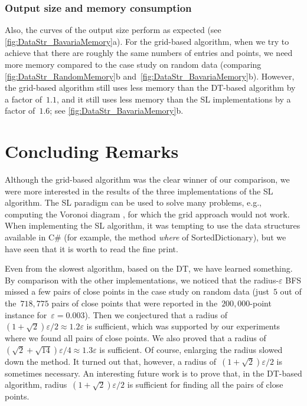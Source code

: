 \subsubsection{Output size and memory consumption}
Also, the curves of the output size perform as expected
(see \fig\ref{fig:DataStr_BavariaMemory}a). 
For the grid-based algorithm, when we try to achieve that 
there are roughly the same numbers of entries and points, 
we need more memory compared to the case study on random data
(comparing \figs\ref{fig:DataStr_RandomMemory}b
and~\ref{fig:DataStr_BavariaMemory}b). 
However, the grid-based algorithm still uses less memory 
than the DT-based algorithm by a factor of~$1.1$, 
and it still uses less memory than the SL 
implementations by a factor of~$1.6$;
see \fig\ref{fig:DataStr_BavariaMemory}b.





\section{Concluding Remarks}\label{sec:DataStr_Conclusion}
Although the grid-based algorithm was the clear winner of our 
comparison, we were more interested in the results of the three 
implementations of the SL algorithm. 
The SL paradigm can be used to solve many problems,
e.g., computing the Voronoi diagram 
\parencite{Fortune1987Voronoi}, 
for which the grid approach would not work. 
When implementing the SL algorithm, 
it was tempting to use the data structures 
available in C\# (for example, the 
method \emph{where} of SortedDictionary), 
but we have seen that it is worth to read the fine print.



Even from the slowest algorithm, based on the DT, 
we have learned something. 
By comparison with the other implementations, 
we noticed that 
the radius-$\varepsilon$ BFS missed a few pairs of close points
in the case study on random data 
(just~$5$ out of the~$718{,}775$ pairs of close points
that were reported in the~$200{,}000$-point instance 
for~$\varepsilon =0.003$). 
Then we conjectured that 
a radius of~$(1+\sqrt{2})\varepsilon /2 
\approx 1.2\varepsilon$ is sufficient, 
which was supported by our experiments 
where we found all pairs of close points. 
We also proved that 
a radius of~$(\sqrt{2}+\sqrt{14})\varepsilon /4
\approx 1.3\varepsilon$ is sufficient. 
Of course, enlarging the radius slowed down the method. 
It turned out that, however, 
a radius of~$(1+\sqrt{2})\varepsilon /2$ 
is sometimes necessary.
An interesting future work is to prove that,
in the DT-based algorithm,
radius~$(1+\sqrt{2})\varepsilon /2$ is sufficient 
for finding all the pairs of close points.




